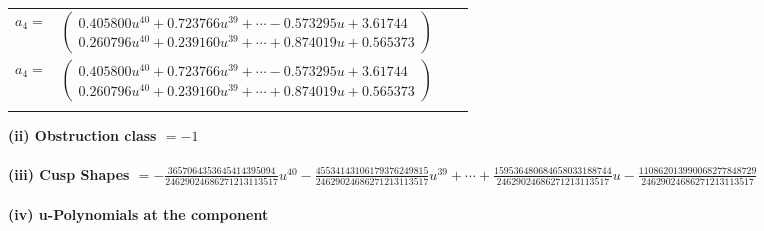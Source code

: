 \documentclass[1p]{elsarticle_modified}
\theoremstyle{definition}
\begin{document}
\begin{tabular}{m{7pt} m{180pt} m{7pt} m{180pt} }
\flushright $a_{4}=$&$\begin{pmatrix}0.405800 u^{40}+0.723766 u^{39}+\cdots-0.573295 u+3.61744\\0.260796 u^{40}+0.239160 u^{39}+\cdots+0.874019 u+0.565373\end{pmatrix}$\\ \flushright $a_{4}=$&$\begin{pmatrix}0.405800 u^{40}+0.723766 u^{39}+\cdots-0.573295 u+3.61744\\0.260796 u^{40}+0.239160 u^{39}+\cdots+0.874019 u+0.565373\end{pmatrix}$\\&\end{tabular}
\flushleft \textbf{(ii) Obstruction class $= -1$}\\~\\
\flushleft \textbf{(iii) Cusp Shapes $= -\frac{3657064353645414395094}{24629024686271213113517} u^{40}-\frac{45534143106179376249815}{24629024686271213113517} u^{39}+\cdots+\frac{159536480684658033188744}{24629024686271213113517} u-\frac{110862013990068277848729}{24629024686271213113517}$}\\~\\
\newpage\renewcommand{\arraystretch}{1}
\flushleft \textbf{(iv) u-Polynomials at the component}\newline \\
\end{document}
